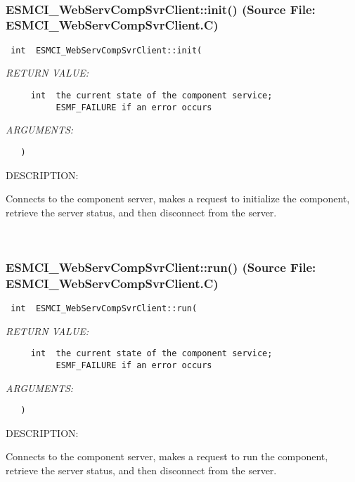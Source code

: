 \mbox{}\hrulefill\
 
\subsubsection{ESMCI\_WebServCompSvrClient::init() (Source File: ESMCI\_WebServCompSvrClient.C)}


  
\begin{verbatim} int  ESMCI_WebServCompSvrClient::init(\end{verbatim}{\em RETURN VALUE:}
\begin{verbatim}     int  the current state of the component service;
          ESMF_FAILURE if an error occurs\end{verbatim}{\em ARGUMENTS:}
\begin{verbatim}   )\end{verbatim}
{\sf DESCRIPTION:\\ }


      Connects to the component server, makes a request to initialize the
      component, retrieve the server status, and then disconnect from
      the server.
   
 
\mbox{}\hrulefill\
 
\subsubsection{ESMCI\_WebServCompSvrClient::run() (Source File: ESMCI\_WebServCompSvrClient.C)}


  
\begin{verbatim} int  ESMCI_WebServCompSvrClient::run(\end{verbatim}{\em RETURN VALUE:}
\begin{verbatim}     int  the current state of the component service;
          ESMF_FAILURE if an error occurs\end{verbatim}{\em ARGUMENTS:}
\begin{verbatim}   )\end{verbatim}
{\sf DESCRIPTION:\\ }


      Connects to the component server, makes a request to run the
      component, retrieve the server status, and then disconnect from
      the server.
   
 
